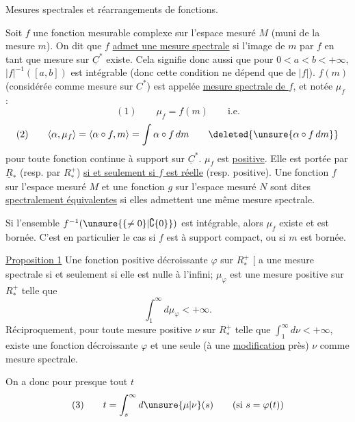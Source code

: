 Mesures spectrales et réarrangements de fonctions.


Soit \(f\) une fonction mesurable complexe sur l'espace mesuré \(M\) (muni de la mesure \(m\)). On dit que \(f\) \uline{admet une mesure spectrale} si l'image de \(m\) par \(f\) en tant que mesure sur \(\underline C^*\) existe. Cela signifie donc aussi que pour \(0<a<b<+\infty\), \(|f|^{-1}([a,b])\) est intégrable (donc cette condition ne dépend que de \(|f|\)). \(f(m)\) (considérée comme mesure sur \(C^*\)) est appelée \uline{mesure spectrale de \(f\)}, et notée \(\mu_f\) :
\[
(1)\qquad \mu_f=f(m)\qquad\text{i.e.}
\]
\[
(2)\qquad\langle\alpha,\mu_f\rangle=\langle\alpha\circ f,m\rangle=\int\alpha\circ f\,dm
\qquad\deleted{\unsure{\alpha\circ f\,dm}}
\]
pour toute fonction continue à support  sur \(\underline C^*\). \(\mu_f\) est \uline{positive}. Elle est portée par \(\underline R_*\) (resp. par \(R_*^+\)) \uline{si et seulement si \(f\) est réelle} (resp. positive).  Une fonction \(f\) sur l'espace mesuré \(M\) et une fonction \(g\) sur l'espace mesuré \(N\) sont dites \uline{spectralement équivalentes} si elles admettent une même mesure spectrale.

 Si l'ensemble \(f^{-1}(\unsure{\{\ne0\}|\complement\{0\}})\) est intégrable, alors \(\mu_f\) existe et est bornée. C'est en particulier le cas si \(f\) est à support compact, ou si \(m\) est bornée.
\inserted{\unsure{Autre cas : toute} \(f\in C_0(M)\), \unsure{plus généralement telle} que, \deleted{\(\unsure{\varepsilon}\)} pour tout \(\varepsilon\), \(|f|^{-1}(]\varepsilon,\infty[)\) est intégrable.}

\uline{Proposition 1}  Une fonction positive décroissante \(\varphi\) sur \(R_*^+\) \(\bigl[\) a une mesure spectrale si et seulement si elle est nulle à l'infini; \(\mu_\varphi\) est une mesure positive sur \(R_*^+\) telle que
\[
\int_1^\infty d\mu_\varphi<+\infty.
\]
Réciproquement, pour toute mesure positive \(\nu\) sur \(R_*^+\) telle que \(\int_1^\infty d\nu<+\infty\), existe une fonction  décroissante \(\varphi\) et une seule (à une \uline{modification}  près)  \(\nu\) comme mesure spectrale.

On a donc pour presque tout \(t\)
\[
(3)\qquad t=\int_s^\infty d\unsure{\mu|\nu}(s)\qquad(\text{si }s=\varphi(t))
\]


